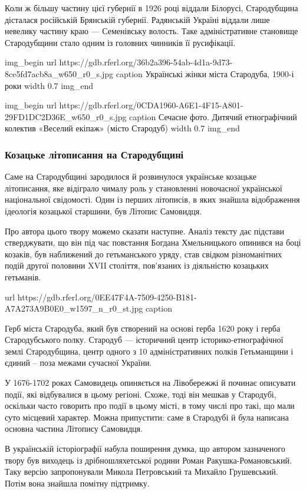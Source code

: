 Коли ж більшу частину цієї губернії в 1926 році віддали Білорусі, Стародубщина
дісталася російській Брянській губернії. Радянській Україні віддали лише
невелику частину краю --- Семенівську волость. Таке адміністративне становище
Стародубщини стало одним із головних чинників її русифікації.

\ifcmt
img_begin 
  url https://gdb.rferl.org/36b2a396-54ab-4d1a-9d73-8ce5fd7acb8a_w650_r0_s.jpg
  caption Українські жінки міста Стародуба, 1900-і роки
  width 0.7
img_end
\fi

\ifcmt
img_begin 
  url https://gdb.rferl.org/0CDA1960-A6E1-4F15-A801-29FD1DC2D36E_w650_r0_s.jpg
  caption Сечасне фото. Дитячий етнографічний колектив «Веселий екіпаж» (місто Стародуб)
  width 0.7
img_end
\fi

\subsubsection{Козацьке літописання на Стародубщині}

Саме на Стародубщині зародилося й розвинулося українське козацьке літописання,
яке відіграло чималу роль у становленні новочасної української національної
свідомості. Один із перших літописів, в яких знайшла відображення ідеологія
козацької старшини, був Літопис Самовидця.

Про автора цього твору можемо сказати наступне. Аналіз тексту дає підстави
стверджувати, що він під час повстання Богдана Хмельницького опинився на боці
козаків, був наближений до гетьманського уряду, став свідком різноманітних
подій другої половини XVII століття, пов’язаних із діяльністю козацьких
гетьманів.

url https://gdb.rferl.org/0EE47F4A-7509-4250-B181-A7A273A9B0E0_w1597_n_r0_st.jpg
caption 

Герб міста Стародуба, який був створений на основі герба 1620 року і герба
Стародубського полку. Стародуб --- історичний центр історико-етнографічної землі
Стародубщина, центр одного з 10 адміністративних полків Гетьманщини і єдиний –
поза межами сучасної України.

У 1676-1702 роках Самовидець опиняється на Лівобережжі й починає описувати
події, які відбувалися в цьому регіоні. Схоже, тоді він мешкав у Стародубі,
оскільки часто говорить про події в цьому місті, в тому числі про такі, що мали
суто місцевий характер. Можна припустити: саме в Стародубі й була написана
основна частина Літопису Самовидця.

В українській історіографії набула поширення думка, що автором зазначеного
твору був виходець із дрібношляхетської родини Роман Ракушка-Романовський. Таку
версію запропонували Микола Петровський та Михайло Грушевський. Потім вона
знайшла помітну підтримку.

